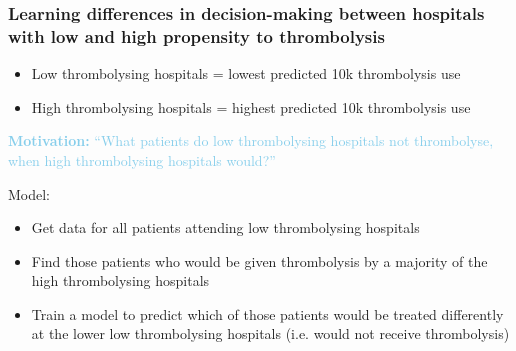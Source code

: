 \documentclass[xcolor={usenames,dvipsnames}]{beamer}
\begin{document}
\begin{frame}
\frametitle{Learning differences in decision-making between hospitals with low and high propensity to thrombolysis}

\vspace{-0.5em}

\begin{itemize}
  \footnotesize
  \item Low thrombolysing hospitals = lowest predicted 10k thrombolysis use
  \item  High thrombolysing hospitals = highest predicted 10k thrombolysis use
\end{itemize} 

\vspace{1.5em}

\textcolor{SkyBlue}{\textbf{Motivation:} ``What patients do low thrombolysing hospitals not thrombolyse, when high thrombolysing hospitals would?''} 

\vspace{1.5em}

Model:
\begin{itemize}
  \footnotesize
  \item Get data for all patients attending low thrombolysing hospitals
  \item Find those patients who would be given thrombolysis by a majority of the high thrombolysing hospitals
  \item Train a model to predict which of those patients would be treated differently at the lower low thrombolysing hospitals (i.e. would not receive thrombolysis)
\end{itemize}

\end{frame}


\end{document}

